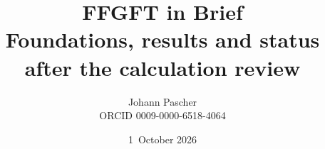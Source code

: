 \documentclass[11pt,a4paper]{report}
\title{FFGFT in Brief\\[0.5em]
  \large Foundations, results and status after the calculation review}
\date{1~October 2026}
\author{Johann Pascher\\\small ORCID 0009-0000-6518-4064}
\begin{document}
\renewcommand{\thechapter}{}
\renewcommand{\thesection}{\arabic{section}}
\maketitle
\tableofcontents

\end{document}

